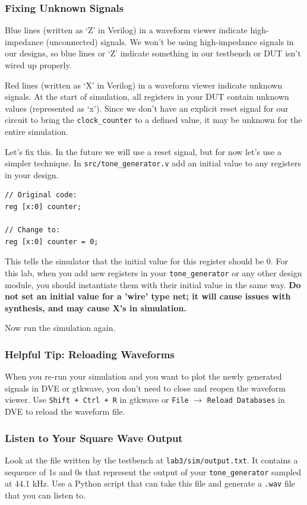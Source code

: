 \documentclass[11pt]{article}
\begin{document}
\subsubsection{Fixing Unknown Signals}
Blue lines (written as `Z' in Verilog) in a waveform viewer indicate high-impedance (unconnected) signals.
We won't be using high-impedance signals in our designs, so blue lines or `Z' indicate something in our testbench or DUT isn't wired up properly.

Red lines (written as `X' in Verilog) in a waveform viewer indicate unknown signals.
At the start of simulation, all registers in your DUT contain unknown values (represented as `x').
Since we don't have an explicit reset signal for our circuit to bring the \verb|clock_counter| to a defined value, it may be unknown for the entire simulation.

Let's fix this. In the future we will use a reset signal, but for now let's use a simpler technique. In \verb|src/tone_generator.v| add an initial value to any registers in your design.
\begin{verbatim}
// Original code:
reg [x:0] counter;

// Change to:
reg [x:0] counter = 0;
\end{verbatim}

This tells the simulator that the initial value for this register should be 0.
For this lab, when you add new registers in your \verb|tone_generator| or any other design module, you should instantiate them with their initial value in the same way.
\textbf{Do not set an initial value for a 'wire' type net; it will cause issues with synthesis, and may cause X's in simulation.}

Now run the simulation again.
\subsubsection{Helpful Tip: Reloading Waveforms}
When you re-run your simulation and you want to plot the newly generated signals in DVE or gtkwave, you don't need to close and reopen the waveform viewer.
Use \verb|Shift + Ctrl + R| in gtkwave or \verb|File| $\rightarrow$ \verb|Reload Databases| in DVE to reload the waveform file.

\subsubsection{Listen to Your Square Wave Output}
Look at the file written by the testbench at \verb|lab3/sim/output.txt|.
It contains a sequence of 1s and 0s that represent the output of your \verb|tone_generator| sampled at 44.1 kHz.
Use a Python script that can take this file and generate a \verb|.wav| file that you can listen to.
\end{document}

